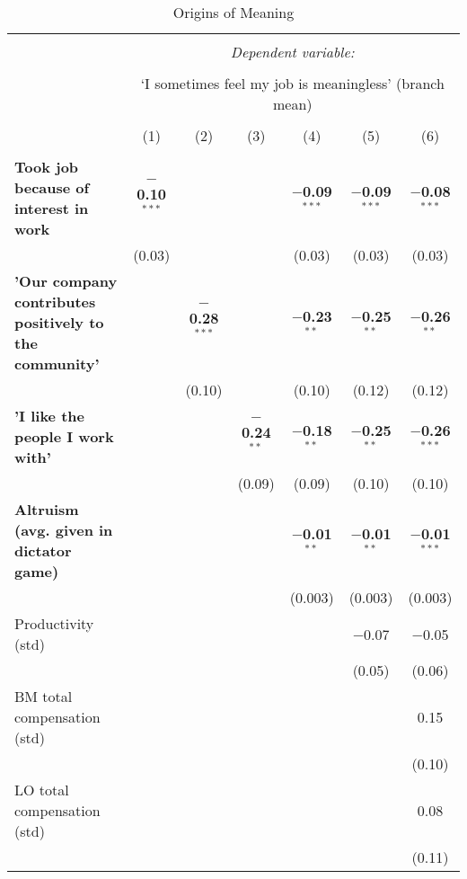 \documentclass[11pt]{article}
\begin{document}
\begin{table}[!htbp] \centering 
  \caption{Origins of Meaning} 
  \label{} 
\footnotesize 
\begin{tabular}{p{7cm}cccccc} 
\\[-1.8ex]\hline 
\hline \\[-1.8ex] 
 & \multicolumn{6}{c}{\textit{Dependent variable:}} \\ 
\cline{2-7} 
\\[-1.8ex] & \multicolumn{6}{c}{`I sometimes feel my job is meaningless' (branch mean)} \\ 
\\[-1.8ex] & (1) & (2) & (3) & (4) & (5) & (6)\\ 
\hline \\[-1.8ex] 
 \textbf{Took job because of interest in work} & \textbf{$-$0.10$^{***}$} &  &  & \textbf{$-$0.09$^{***}$} & \textbf{$-$0.09$^{***}$} & \textbf{$-$0.08$^{***}$} \\ 
  & (0.03) &  &  & (0.03) & (0.03) & (0.03) \\ 
  \textbf{'Our company contributes positively to the community'} &  & \textbf{$-$0.28$^{***}$} &  & \textbf{$-$0.23$^{**}$} & \textbf{$-$0.25$^{**}$} & \textbf{$-$0.26$^{**}$} \\ 
  &  & (0.10) &  & (0.10) & (0.12) & (0.12) \\ 
  \textbf{'I like the people I work with'} &  &  & \textbf{$-$0.24$^{**}$} & \textbf{$-$0.18$^{**}$} & \textbf{$-$0.25$^{**}$} & \textbf{$-$0.26$^{***}$} \\ 
  &  &  & (0.09) & (0.09) & (0.10) & (0.10) \\ 
  \textbf{Altruism (avg. given in dictator game)} &  &  &  & \textbf{$-$0.01$^{**}$} & \textbf{$-$0.01$^{**}$} & \textbf{$-$0.01$^{***}$} \\ 
  &  &  &  & (0.003) & (0.003) & (0.003) \\ 
  Productivity (std) &  &  &  &  & $-$0.07 & $-$0.05 \\ 
  &  &  &  &  & (0.05) & (0.06) \\ 
  BM total compensation (std) &  &  &  &  &  & 0.15 \\ 
  &  &  &  &  &  & (0.10) \\ 
  LO total compensation (std) &  &  &  &  &  & 0.08 \\ 
  &  &  &  &  &  & (0.11) \\ 

\end{tabular}
\end{table}
\end{document}
